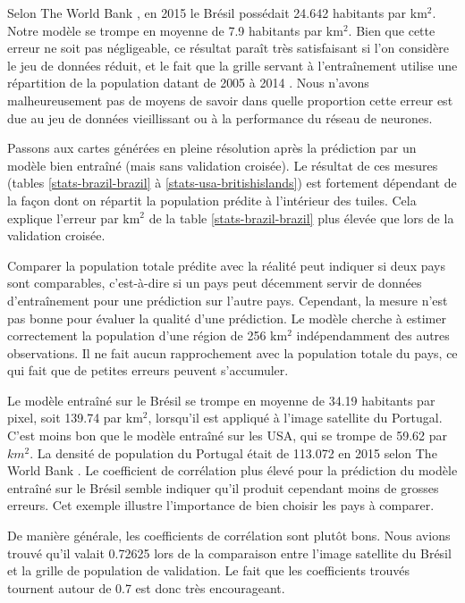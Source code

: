 \documentclass[a4paper, 11pt]{report}
\begin{document}
Selon The World Bank \cite{theworldbank}, en 2015 le Brésil possédait 24.642 habitants par km$^2$. Notre modèle se trompe en moyenne de 7.9 habitants par km$^2$. Bien que cette erreur ne soit pas négligeable, ce résultat paraît très satisfaisant si l'on considère le jeu de données réduit, et le fait que la grille servant à l'entraînement utilise une répartition de la population datant de 2005 à 2014 \cite{sedac}. Nous n'avons malheureusement pas de moyens de savoir dans quelle proportion cette erreur est due au jeu de données vieillissant ou à la performance du réseau de neurones.

Passons aux cartes générées en pleine résolution après la prédiction par un modèle bien entraîné (mais sans validation croisée). Le résultat de ces mesures (tables \ref{stats-brazil-brazil} à \ref{stats-usa-britishislands}) est fortement dépendant de la façon dont on répartit la population prédite à l'intérieur des tuiles. Cela explique l'erreur par km$^2$ de la table \ref{stats-brazil-brazil} plus élevée que lors de la validation croisée.

Comparer la population totale prédite avec la réalité peut indiquer si deux pays sont comparables, c'est-à-dire si un pays peut décemment servir de données d'entraînement pour une prédiction sur l'autre pays. Cependant, la mesure n'est pas bonne pour évaluer la qualité d'une prédiction. Le modèle cherche à estimer correctement la population d'une région de 256 km$^2$ indépendamment des autres observations. Il ne fait aucun rapprochement avec la population totale du pays, ce qui fait que de petites erreurs peuvent s'accumuler.

Le modèle entraîné sur le Brésil se trompe en moyenne de 34.19 habitants par pixel, soit 139.74 par km$^2$, lorsqu'il est appliqué à l'image satellite du Portugal. C'est moins bon que le modèle entraîné sur les USA, qui se trompe de 59.62 par $km^2$. La densité de population du Portugal était de 113.072 en 2015 selon The World Bank \cite{theworldbank}. Le coefficient de corrélation plus élevé pour la prédiction du modèle entraîné sur le Brésil semble indiquer qu'il produit cependant moins de grosses erreurs. Cet exemple illustre l'importance de bien choisir les pays à comparer.

De manière générale, les coefficients de corrélation sont plutôt bons. Nous avions trouvé qu'il valait 0.72625 lors de la comparaison entre l'image satellite du Brésil et la grille de population de validation. Le fait que les coefficients trouvés tournent autour de 0.7 est donc très encourageant.
\end{document}
